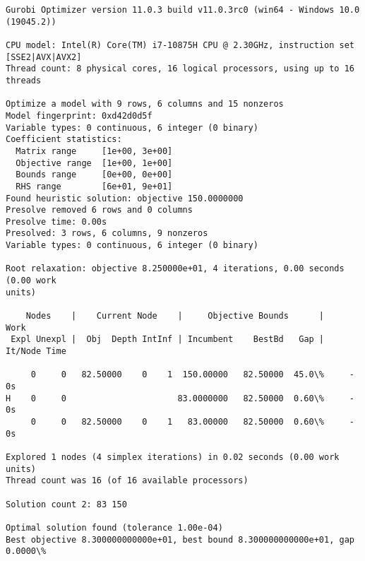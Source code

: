 \documentclass[11pt]{article}
\begin{document}
    \begin{Verbatim}[commandchars=\\\{\}]
Gurobi Optimizer version 11.0.3 build v11.0.3rc0 (win64 - Windows 10.0
(19045.2))

CPU model: Intel(R) Core(TM) i7-10875H CPU @ 2.30GHz, instruction set
[SSE2|AVX|AVX2]
Thread count: 8 physical cores, 16 logical processors, using up to 16 threads

Optimize a model with 9 rows, 6 columns and 15 nonzeros
Model fingerprint: 0xd42d0d5f
Variable types: 0 continuous, 6 integer (0 binary)
Coefficient statistics:
  Matrix range     [1e+00, 3e+00]
  Objective range  [1e+00, 1e+00]
  Bounds range     [0e+00, 0e+00]
  RHS range        [6e+01, 9e+01]
Found heuristic solution: objective 150.0000000
Presolve removed 6 rows and 0 columns
Presolve time: 0.00s
Presolved: 3 rows, 6 columns, 9 nonzeros
Variable types: 0 continuous, 6 integer (0 binary)

Root relaxation: objective 8.250000e+01, 4 iterations, 0.00 seconds (0.00 work
units)

    Nodes    |    Current Node    |     Objective Bounds      |     Work
 Expl Unexpl |  Obj  Depth IntInf | Incumbent    BestBd   Gap | It/Node Time

     0     0   82.50000    0    1  150.00000   82.50000  45.0\%     -    0s
H    0     0                      83.0000000   82.50000  0.60\%     -    0s
     0     0   82.50000    0    1   83.00000   82.50000  0.60\%     -    0s

Explored 1 nodes (4 simplex iterations) in 0.02 seconds (0.00 work units)
Thread count was 16 (of 16 available processors)

Solution count 2: 83 150

Optimal solution found (tolerance 1.00e-04)
Best objective 8.300000000000e+01, best bound 8.300000000000e+01, gap 0.0000\%
    \end{Verbatim}
\end{document}
